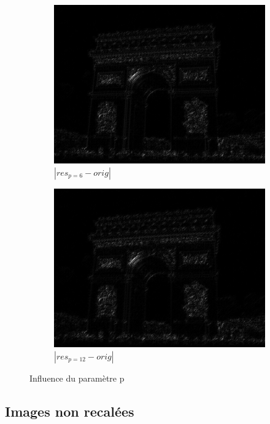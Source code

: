 \documentclass[a4paper,10pt]{report}
\begin{document}
\begin{figure}[h]
\begin{subfigure}{0.32\textwidth}
    \includegraphics[width=0.99\linewidth]{ressource/diffp6stretch.png} 
    \caption{\(|res_{p=6} - orig|\)}
    \label{fig:diffp6}
  \end{subfigure}
  \begin{subfigure}{0.32\textwidth}
    \includegraphics[width=0.99\linewidth]{ressource/diffp12stretch.png} 
    \caption{\(|res_{p=12} - orig|\)}
    \label{fig:diffp12}
  \end{subfigure}
  
  \caption{Influence du paramètre p}
  \label{fig:param_p}
\end{figure}

\subsection{Images non recalées}
\end{document}
